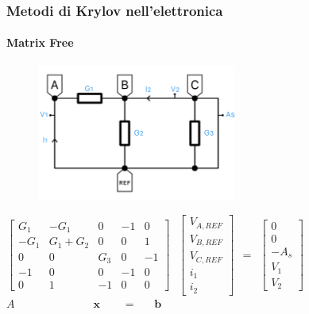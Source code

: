 \documentclass[10pt]{beamer}
\begin{document}
\begin{frame}\frametitle{Metodi di Krylov nell'elettronica}\framesubtitle{\textbf{Matrix Free}}

\begin{figure}
    \includegraphics[width=.90\linewidth,height=4.5cm,keepaspectratio]{my_circuit.png}
\end{figure}

$\begin{bmatrix}
G_1 & -G_1 & 0 & -1 & 0 \\ -G_1 & G_1 + G_2 & 0 & 0 & 1 \\ 0 & 0 & G_3 & 0 & -1 \\ -1 & 0 & 0 & -1 & 0 \\ 0 & 1 & -1 & 0 & 0
\end{bmatrix} \ \ \ \begin{bmatrix}V_{A,REF} \\ V_{B,REF} \\ V_{C,REF}\\ i_1 \\ i_2\end{bmatrix} \ \  = \ \ \begin{bmatrix} 0 \\ 0\\ -A_s\\ V_1 \\ V_2 \end{bmatrix}$
\\ \centering $A  \ \ \ \ \ \ \ \ \ \ \ \ \ \ \ \ \ \ \ \ \ \ \ \ \ \ \ \ \ \ \ \ \mathbf{x} \ \ \ \ \ \ \ \ \ = \ \ \  \ \ \ \ \mathbf{b}$
\begin{itemize}

\end{itemize}

\end{frame}
\end{document}
